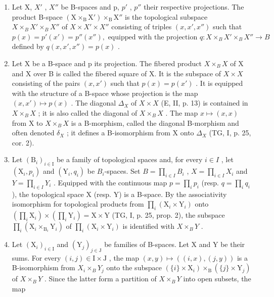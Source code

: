\begin{enumerate}
\def\labelenumi{\arabic{enumi})}
\setcounter{enumi}{1}
\item
  Let X, \(X'\) , \(X''\) be B-spaces and p, \(p'\) , \(p''\) their respective projections. The product B-space \((\mathrm{X} \times_{\mathrm{B}} \mathrm{X}') \times_{\mathrm{B}} \mathrm{X}''\) is the topological subspace \(X \times_{B} X' \times_{B} X''\) of \(X \times X' \times X''\) consisting of triples \((x, x', x'')\) such that \(p(x) = p'(x') = p''(x''), \text{ equipped with the projection } q: X \times_{B} X' \times_{B} X'' \to B\) defined by \(q(x, x', x'') = p(x)\) .
\item
  Let X be a B-space and p its projection. The fibered product \(X \times_{B} X\) of X and X over B is called the fibered square of X. It is the subspace of \(X \times X\) consisting of the pairs \((x, x')\) such that \(p(x) = p(x')\) . It is equipped with the structure of a B-space whose projection is the map \((x, x') \mapsto p(x)\) . The diagonal \(\Delta_{X}\) of \(X \times X\) (E, II, p. 13) is contained in \(X \times_{B} X\) ; it is also called the diagonal of \(X \times_{B} X\) . The map \(x \mapsto (x, x)\) from X to \(X \times_{B} X\) is a B-morphism, called the diagonal B-morphism and often denoted \(\delta_{X}\) ; it defines a B-isomorphism from X onto \(\Delta_{X}\) (TG, I, p. 25, cor. 2).
\item
  Let \((\mathrm{B}_{i})_{i\in\mathrm{I}}\) be a family of topological spaces and, for every \(i\in I\) , let \((\mathrm{X}_{i},p_{i})\) and \((\mathrm{Y}_{i},q_{i})\) be \(B_{i}\)-spaces. Set \(B=\prod_{i\in I}B_{i}\) , \(X=\prod_{i\in I}X_{i}\) and \(Y=\prod_{i\in I}Y_{i}\) . Equipped with the continuous map \(p=\prod_{i}p_{i}\) (resp. \(q=\prod_{i}q_{i}\) ), the topological space X (resp. Y) is a B-space. By the associativity isomorphism for topological products from \(\prod_{i}(\mathrm{X}_{i}\times\mathrm{Y}_{i})\) onto \((\prod_{i}\mathrm{X}_{i})\times(\prod_{i}\mathrm{Y}_{i})=\mathrm{X}\times\mathrm{Y}\) (TG, I, p. 25, prop. 2), the subspace \(\prod_{i}(\mathrm{X}_{i}\times_{\mathrm{B}_{i}}\mathrm{Y}_{i})\) of \(\prod_{i}(\mathrm{X}_{i}\times\mathrm{Y}_{i})\) is identified with \(X\times_{B}Y\) .
\item
  Let \((\mathrm{X}_{i})_{i\in\mathrm{I}}\) and \((\mathrm{Y}_{j})_{j\in\mathrm{J}}\) be families of B-spaces. Let X and Y be their sums. For every \((i,j)\in\mathrm{I}\times\mathrm{J}\) , the map \((x,y)\mapsto((i,x),(j,y))\) is a B-isomorphism from \(X_{i}\times_{B}Y_{j}\) onto the subspace \((\{i\}\times\mathrm{X}_{i})\times_{\mathrm{B}}(\{j\}\times\mathrm{Y}_{j})\) of \(X\times_{B}Y\) . Since the latter form a partition of \(X\times_{B}Y\) into open subsets, the map
\end{enumerate}

